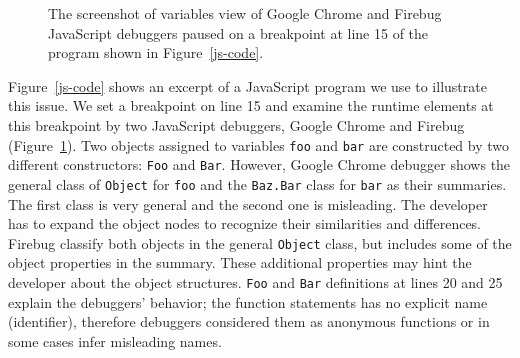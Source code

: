 \documentclass[10pt, preprint]{sigplanconf}
\begin{document}
\begin{figure}[htp]
\centerline{
\hfil
{}}
\caption{The screenshot of variables view of Google Chrome and Firebug JavaScript debuggers paused on a breakpoint at line 15 of the program shown in Figure~\ref{js-code}.}
\label{debuggers-objects}
\end{figure}


Figure~\ref{js-code} shows an excerpt of a JavaScript program we use to illustrate this issue. We set a breakpoint on line 15 and examine the runtime elements at this breakpoint by two JavaScript debuggers, Google Chrome and Firebug (Figure~\ref{debuggers-objects}). Two objects assigned to variables \verb|foo| and \verb|bar| are constructed by two different constructors: \verb|Foo| and \verb|Bar|. However, Google Chrome debugger shows the general class of \verb|Object| for \verb|foo| and the \verb|Baz.Bar| class for \verb|bar| as their summaries. The first class is very general and the second one is misleading. The developer has to expand the object nodes to recognize their similarities and differences. Firebug classify both objects in the general \verb|Object| class, but includes some of the object properties in the summary. These additional properties may hint the developer about the object structures. \verb|Foo| and \verb|Bar| definitions at lines 20 and 25 explain the debuggers' behavior; the function statements has no explicit name (identifier), therefore debuggers considered them as anonymous functions or in some cases infer misleading names.
 
\end{document}
